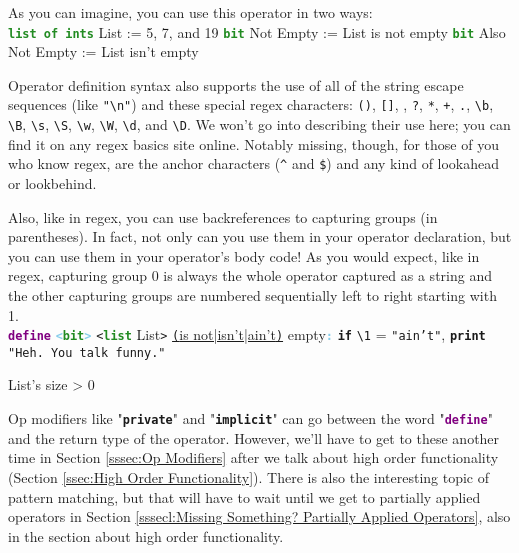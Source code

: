 \documentclass{article}
\newcommand{\type}[1]{\texttt{\textcolor{ForestGreen}{\textbf{#1}}}}
\newcommand{\keyop}[1]{\texttt{\textcolor{Purple}{\textbf{#1}}}}
\newcommand{\common}[1]{\texttt{\textcolor{Mulberry}{\textbf{#1}}}}
\newcommand{\defpunct}[1]{\texttt{\textcolor{SkyBlue}{\textbf{#1}}}}
\newcommand{\codespecial}[1]{\texttt{\textcolor{CarnationPink}{#1}}}
\newcommand{\codestring}[1]{\texttt{\textcolor{NavyBlue}{"#1"}}}
\newenvironment{code}[0]
{\ttfamily{}				%
\setlength\parindent{0cm}	%
~\\}
{\setlength\parindent{1cm}
~\\}
\begin{document}
\indent As you can imagine, you can use this operator in two ways:
\begin{code}
\type{list of ints} List := 5, 7, and 19
\type{bit} Not Empty := List is not empty
\type{bit} Also Not Empty := List isn't empty
\end{code}

\indent Operator definition syntax also supports the use of all of the string escape sequences (like \codestring{\textbackslash{}n}) and these special regex characters: \codespecial{()}, \codespecial{[]}, \codespecial{{}}, \codespecial{?}, \codespecial{*}, \codespecial{+}, \codespecial{.}, \codespecial{\textbackslash{}b}, \codespecial{\textbackslash{}B}, \codespecial{\textbackslash{}s}, \codespecial{\textbackslash{}S}, \codespecial{\textbackslash{}w}, \codespecial{\textbackslash{}W}, \codespecial{\textbackslash{}d}, and \codespecial{\textbackslash{}D}. We won't go into describing their use here; you can find it on any regex basics site online. Notably missing, though, for those of you who know regex, are the anchor characters (\codespecial{\textasciicircum} and \codespecial{\$}) and any kind of lookahead or lookbehind.

\indent Also, like in regex, you can use backreferences to capturing groups (in parentheses). In fact, not only can you use them in your operator declaration, but you can use them in your operator's body code! As you would expect, like in regex, capturing group 0 is always the whole operator captured as a string and the other capturing groups are numbered sequentially left to right starting with 1.
\begin{code}
\keyop{define} \defpunct{<}\type{bit}\defpunct{>} \codespecial{<}\type{list} List\codespecial{>} \underline{\codespecial{(}is not|isn't|ain't\codespecial{)}} empty\defpunct{:}
\qquad{}\common{if} \codespecial{\textbackslash{}1} = \codestring{ain't},
\qquad{}\qquad{}\common{print} \codestring{Heh. You talk funny.}

\qquad{}List's size > 0
\end{code}

\indent Op modifiers like "\common{private}" and "\common{implicit}" can go between the word "\keyop{define}" and the return type of the operator. However, we'll have to get to these another time in Section \ref{sssec:Op Modifiers} after we talk about high order functionality (Section \ref{ssec:High Order Functionality}).
\indent There is also the interesting topic of pattern matching, but that will have to wait until we get to partially applied operators in Section \ref{sssecl:Missing Something? Partially Applied Operators}, also in the section about high order functionality.
\end{document}
